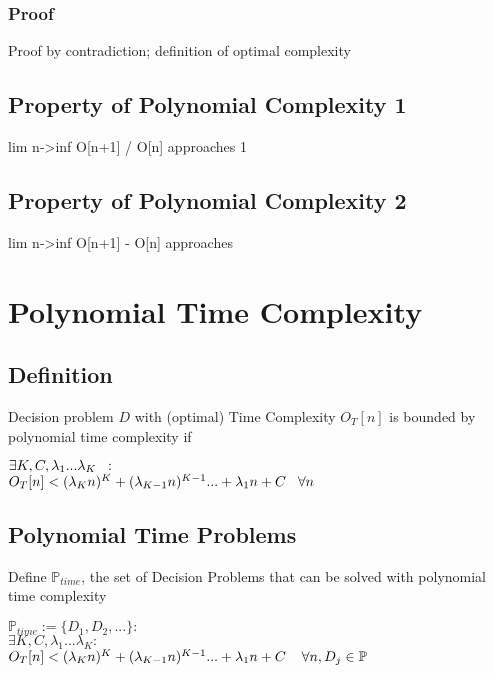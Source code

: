 \documentclass[11pt]{article}
\begin{document}
\subsubsection{Proof}
Proof by contradiction; definition of optimal complexity









\subsection{Property of Polynomial  Complexity 1}
lim n->inf O[n+1] / O[n] approaches 1


\subsection{Property of Polynomial Complexity 2}
lim n->inf O[n+1] - O[n] approaches









\newpage
\section{Polynomial Time Complexity}

\subsection{Definition}
Decision problem $D$ with (optimal) Time Complexity $O_T[n]$ is bounded by polynomial time complexity if
\begin{center}
$\exists K,C,\lambda_1...\lambda_K \hspace{2mm} :$
\\ \vspace{2mm}
$O_T[n] < (\lambda_K n)^K + (\lambda_{K-1} n)^{K-1}... + \lambda_1 n + C \hspace{3mm} \forall n$
\end{center}








\subsection{Polynomial Time Problems}
Define $\mathbb{P}_{time}$, the set of Decision Problems that can be solved with polynomial time complexity
\begin{center}
$
\mathbb{P}_{time} := \{D_1,D_2,...\} : 
$
\\
$
\exists K,C,\lambda_1...\lambda_K : 
$
\\
$
O_T[n] < (\lambda_K n)^K + (\lambda_{K-1} n)^{K-1}... + \lambda_1 n + C \hspace{4mm} \forall n, D_j \in \mathbb{P}
$
\end{center}
\end{document}
